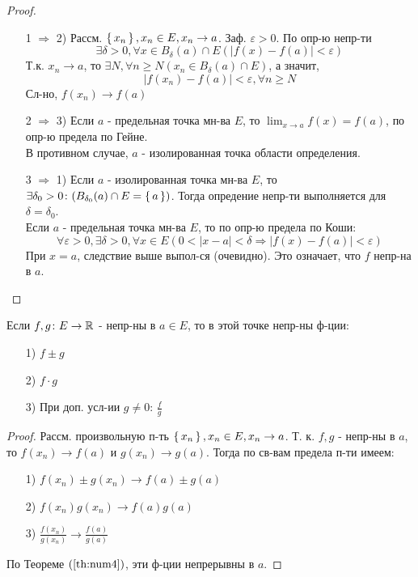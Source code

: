 \begin{proof}
  ~\newline
\begin{itemize}
  \item [1 $\Rightarrow$ 2)]  Рассм. $\set{x_n}, x_n \in E, x_n \rightarrow a$. Заф. $\varepsilon > 0$. По опр-ю непр-ти
    \[
      \exists \delta > 0, \forall x \in B_{\delta}(a) \cap E (\left|f(x) - f(a)\right| < \varepsilon)
    \]
    Т.к. $x_n \rightarrow a$, то $\exists N, \forall n \geq N (x_n \in B_{\delta}(a) \cap E)$, а значит,
    \[
      \left|f(x_n) - f(a)\right| < \varepsilon, \forall n \geq N
    \]
    Сл-но, $f(x_n) \rightarrow f(a)$
  \item [2 $\Rightarrow$ 3)] Если $a$ - предельная точка мн-ва $E$, то $\lim_{x\to a} f(x) = f(a)$, по опр-ю предела по Гейне. \\

    В противном случае, $a$ - изолированная точка области определения.
  \item [3 $\Rightarrow$ 1)] Если $a$ - изолированная точка мн-ва $E$, то $\exists \delta_0 > 0 \colon (B_{\delta_0}(a) \cap E = \set{a})$. Тогда опредение непр-ти выполняется для $\delta = \delta_0$. \\

    Если $a$ - предельная точка мн-ва $E$, то по опр-ю предела по Коши:
    \[
    \forall \varepsilon > 0, \exists \delta > 0, \forall x \in E (0 < \left|x - a\right| < \delta \Rightarrow \left|f(x) - f(a)\right| < \varepsilon)
    \]
    При $x = a$, следствие выше выпол-ся (очевидно). Это означает, что $f$ непр-на в $a$.
    
\end{itemize}
\end{proof}
\begin{consequence}
\label{cs:ar_op_nep}
Если $f, g \colon E \rightarrow \mathbb{R}$ - непр-ны в $a \in E$, то в этой точке непр-ны ф-ции:
\begin{itemize}
  \item [1) ] $f \pm g$
  \item [2) ] $f \cdot g$ \\
  \item [3) ] При доп. усл-ии $g \neq 0$: $\frac{f}{g}$
\end{itemize}
\end{consequence} 
\begin{proof}
Рассм. произвольную п-ть $\set{x_n}, x_n \in E, x_n \rightarrow a$. Т. к. $f, g$ - непр-ны в $a$, то $f(x_n) \rightarrow f(a)$ и $g(x_n) \rightarrow g(a)$. Тогда по св-вам предела п-ти имеем:
\begin{itemize}
  \item [1) ] $f(x_n) \pm g(x_n) \rightarrow f(a) \pm g(a)$
  \item [2) ] $f(x_n)g(x_n) \rightarrow f(a)g(a)$
  \item [3) ] $\frac{f(x_n)}{g(x_n)} \rightarrow \frac{f(a)}{g(a)}$
\end{itemize}
По Теореме $(\ref{th:num4})$, эти ф-ции непрерывны в $a$.
\end{proof}
